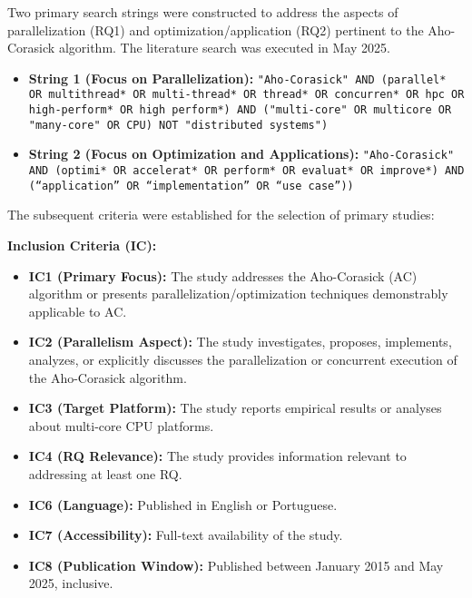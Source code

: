 Two primary search strings were constructed to address the aspects of parallelization (RQ1) and optimization/application (RQ2) pertinent to the Aho-Corasick algorithm. The literature search was executed in May 2025.
\begin{itemize}
    \item \textbf{String 1 (Focus on Parallelization):} \texttt{"Aho-Corasick" AND (parallel* OR multithread* OR multi-thread* OR thread* OR concurren* OR hpc OR high-perform* OR high perform*) AND ("multi-core" OR multicore OR "many-core" OR CPU) NOT "distributed systems")}
    \item \textbf{String 2 (Focus on Optimization and Applications):} \texttt{"Aho-Corasick" AND (optimi* OR accelerat* OR perform* OR evaluat* OR improve*) AND (“application” OR “implementation” OR “use case”))}
\end{itemize}


The subsequent criteria were established for the selection of primary studies:

\textbf{Inclusion Criteria (IC):}
\begin{itemize}
    \item \textbf{IC1 (Primary Focus):} The study addresses the Aho-Corasick (AC) algorithm or presents parallelization/optimization techniques demonstrably applicable to AC.
    \item \textbf{IC2 (Parallelism Aspect):} The study investigates, proposes, implements, analyzes, or explicitly discusses the parallelization or concurrent execution of the Aho-Corasick algorithm.
    \item \textbf{IC3 (Target Platform):} The study reports empirical results or analyses about multi-core CPU platforms.
    \item \textbf{IC4 (RQ Relevance):} The study provides information relevant to addressing at least one RQ.
    \item \textbf{IC6 (Language):} Published in English or Portuguese.
    \item \textbf{IC7 (Accessibility):} Full-text availability of the study.
    \item \textbf{IC8 (Publication Window):} Published between January 2015 and May 2025, inclusive.
\end{itemize}

